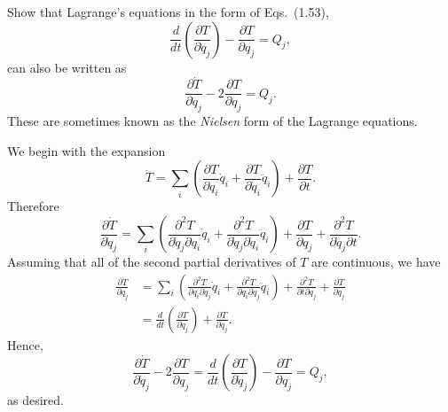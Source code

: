 \begin{questions}
\question Show that Lagrange's equations in the form of Eqs.~(1.53),
\[
\frac{d}{dt} \left( \frac{\partial T}{\partial \dot{q}_j} \right) - \frac{\partial T}{\partial q_j} = Q_j,
\]
can also be written as
\[
\frac{\partial \dot{T}}{\partial \dot{q}_j} - 2 \frac{\partial T}{\partial q_j} = Q_j.
\]
These are sometimes known as the \emph{Nielsen} form of the Lagrange equations.
\begin{solution}
We begin with the expansion
\[
\dot{T} = \sum_i \left( \frac{\partial T}{\partial q_i} \dot{q}_i + \frac{\partial T}{\partial \dot{q}_i} \ddot{q}_i \right) + \frac{\partial T}{\partial t}.
\]
Therefore
\[
\frac{\partial \dot{T}}{\partial \dot{q}_j} = \sum_i \left( \frac{\partial^2 T}{\partial \dot{q}_j \partial q_i} \dot{q}_i + \frac{\partial^2 T}{\partial \dot{q}_j \partial \dot{q}_i} \ddot{q}_i \right) + \frac{\partial T}{\partial q_j} + \frac{\partial^2 T}{\partial \dot{q}_j \partial t}.
\]
Assuming that all of the second partial derivatives of $T$ are continuous, we have
\begin{align*}
\frac{\partial \dot{T}}{\partial \dot{q}_j} &= \sum_i \left( \frac{\partial^2 T}{\partial q_i \partial \dot{q}_j} \dot{q}_i + \frac{\partial^2 T}{\partial \dot{q}_i \partial \dot{q}_j} \ddot{q}_i \right) + \frac{\partial^2 T}{\partial t \partial \dot{q}_j} + \frac{\partial T}{\partial q_j} \\
&= \frac{d}{dt} \left( \frac{\partial T}{\partial \dot{q}_j} \right) + \frac{\partial T}{\partial q_j}.
\end{align*}
Hence,
\[
\frac{\partial \dot{T}}{\partial \dot{q}_j} - 2 \frac{\partial T}{\partial q_j} = \frac{d}{dt} \left( \frac{\partial T}{\partial \dot{q}_j} \right) - \frac{\partial T}{\partial q_j} = Q_j,
\]
as desired.
\end{solution}


\end{questions}
